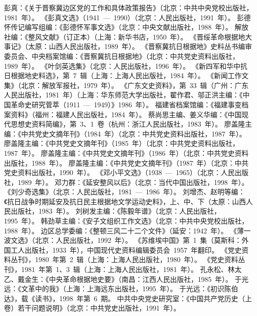 \begin{thebibliography}{999}
\bibitem{}彭真：《关于晋察冀边区党的工作和具体政策报告》（北京：中共中央党校出版社，1981~年）。
\bibitem{}《彭真文选》（1941~—~1990）（北京：人民出版社，1991~年）。
\bibitem{}彭德怀传记编写组编：《彭德怀军事文选》（北京：中央文献出版社，1988~年）。
\bibitem{}解放社编：《整风文献》（订正本）（上海：新华书店，1950~年）。
\bibitem{}《晋绥革命根据地大事记》（太原：山西人民出版社，1989~年）。
\bibitem{}《晋察冀抗日根据地》史料丛书编审委员会、中央档案馆编：《晋察冀抗日根据地》（北京：中共党史资料出版社，1989~年）。
\bibitem{}《叶剑英选集》（北京：人民出版社，1996~年）。
\bibitem{}《新四军和华中抗日根据地史料选》，第~7~辑（上海：上海人民出版社，1984~年）。
\bibitem{}《新闻工作文集》（北京：解放军报社，1979~年）。
\bibitem{}《广东文史资料》，第~33~辑（广州：广东人民出版社，1981~年）（上海：华东师范大学出版社，翟作君、邬正洪主编：《中国革命史研究菅萃（1911~—~1949）》1986~年）。
\bibitem{}福建省档案馆编：《福建事变档案资料》（福州：福建人民出版社，1984~年）。
\bibitem{}蔡尚思主编、姜义华编：《中国现代思想史资料简编》，第~3、1~卷（杭州：浙江人民出版社，1983~年）。
\bibitem{}廖盖隆主编：《中共党史文摘年刊》（1984~年）（北京：中共党史资料出版社，1987~年）。
\bibitem{}廖盖隆主编：《中共党史文摘年刊》（1985~年）（北京：中共党史资料出版社，1987~年）。
\bibitem{}廖盖隆主编：《中共党史文摘年刊》（1986~年）（北京：中共党史资料出版社，1988~年）。
\bibitem{}廖盖隆主编：《中共党史文摘年刊》（1987~年）（北京：中共党史资料出版社，1990~年）。
\bibitem{}《邓小平文选》（1938~—~1965）（北京：人民出版社，1989~年）。
\bibitem{}邓力群：《延安整风以后》（北京：当代中国出版社，1998~年）。
\bibitem{}《刘少奇选集》（北京：人民出版社，1981~—~1986~年）。
\bibitem{}刘增杰、赵明等编：《抗日战争时期延安及抗日民主根据地文学运动史料》，上、中、下（太原：山西人民出版社，1983~年）。
\bibitem{}刘树发主编：《陈毅年谱》（北京：人民出版社，1995~年）。
\bibitem{}韩劲草主编：《安子文组织工作文选》（北京：中共中央党校出版社，1988~年）。
\bibitem{}边区总学委编：《整顿三风二十二个文件》（延安：1942~年）。
\bibitem{}《薄一波文选》（北京：人民出版社，1992~年）。
\bibitem{}《苏维埃中国》第~1~集（莫斯科：外国工人出版社，1933~年），中国现代史资料编辑委员会~1957~年翻印。
\bibitem{}《党史资料丛刊》，1980~年第~2~辑（上海：上海人民出版社，1980~年）。
\bibitem{}《党史资料丛刊》，1981~年第~1、3~辑（上海：上海人民出版社，1981~年）。
\bibitem{}孔永松、林太乙、戴金生：《中央革命根据地史要》（南昌：江西人民出版社，1985~年）。
\bibitem{}于光远：《文革中的我》（上海：上海远东出版社，1995~年）。
\bibitem{}于光远：《初识陈伯达》，载《读书》，1998~年第~6~期。
\bibitem{}中共中央党史研究室：《中国共产党历史（上卷）若干问题说明》（北京：中共党史出版社，1991~年）。

\end{thebibliography}
